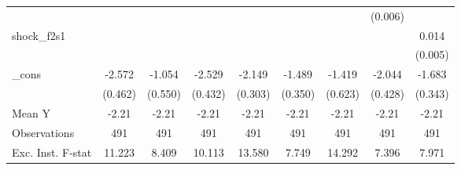 {\begin{tabular}{l*{8}{c}}
            &                     &                     &                     &                     &                     &                     &     (0.006)         &                     \\
\addlinespace
shock\_f2s1  &                     &                     &                     &                     &                     &                     &                     &       0.014\sym{***}\\
            &                     &                     &                     &                     &                     &                     &                     &     (0.005)         \\
\addlinespace
\_cons      &      -2.572\sym{***}&      -1.054\sym{*}  &      -2.529\sym{***}&      -2.149\sym{***}&      -1.489\sym{***}&      -1.419\sym{**} &      -2.044\sym{***}&      -1.683\sym{***}\\
            &     (0.462)         &     (0.550)         &     (0.432)         &     (0.303)         &     (0.350)         &     (0.623)         &     (0.428)         &     (0.343)         \\
\midrule
Mean Y      &       -2.21         &       -2.21         &       -2.21         &       -2.21         &       -2.21         &       -2.21         &       -2.21         &       -2.21         \\
Observations&         491         &         491         &         491         &         491         &         491         &         491         &         491         &         491         \\
Exc. Inst. F-stat&      11.223         &       8.409         &      10.113         &      13.580         &       7.749         &      14.292         &       7.396         &       7.971         \\
\bottomrule
\end{tabular}
}
